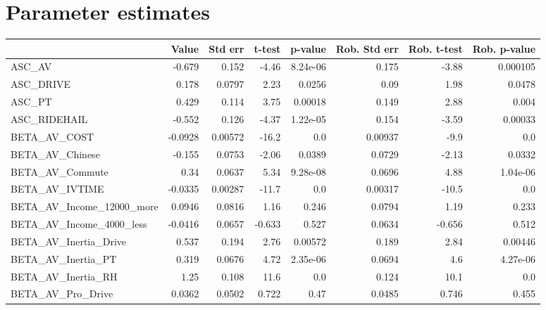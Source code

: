 \section{Parameter estimates}
\begin{tabular}{lrrrrrrr}
\toprule
{} &    Value &  Std err &   t-test &  p-value &  Rob. Std err &  Rob. t-test &  Rob. p-value \\
\midrule
ASC\_AV                       &   -0.679 &    0.152 &    -4.46 & 8.24e-06 &         0.175 &        -3.88 &      0.000105 \\
ASC\_DRIVE                    &    0.178 &   0.0797 &     2.23 &   0.0256 &          0.09 &         1.98 &        0.0478 \\
ASC\_PT                       &    0.429 &    0.114 &     3.75 &  0.00018 &         0.149 &         2.88 &         0.004 \\
ASC\_RIDEHAIL                 &   -0.552 &    0.126 &    -4.37 & 1.22e-05 &         0.154 &        -3.59 &       0.00033 \\
BETA\_AV\_COST                 &  -0.0928 &  0.00572 &    -16.2 &      0.0 &       0.00937 &         -9.9 &           0.0 \\
BETA\_AV\_Chinese              &   -0.155 &   0.0753 &    -2.06 &   0.0389 &        0.0729 &        -2.13 &        0.0332 \\
BETA\_AV\_Commute              &     0.34 &   0.0637 &     5.34 & 9.28e-08 &        0.0696 &         4.88 &      1.04e-06 \\
BETA\_AV\_IVTIME               &  -0.0335 &  0.00287 &    -11.7 &      0.0 &       0.00317 &        -10.5 &           0.0 \\
BETA\_AV\_Income\_12000\_more    &   0.0946 &   0.0816 &     1.16 &    0.246 &        0.0794 &         1.19 &         0.233 \\
BETA\_AV\_Income\_4000\_less     &  -0.0416 &   0.0657 &   -0.633 &    0.527 &        0.0634 &       -0.656 &         0.512 \\
BETA\_AV\_Inertia\_Drive        &    0.537 &    0.194 &     2.76 &  0.00572 &         0.189 &         2.84 &       0.00446 \\
BETA\_AV\_Inertia\_PT           &    0.319 &   0.0676 &     4.72 & 2.35e-06 &        0.0694 &          4.6 &      4.27e-06 \\
BETA\_AV\_Inertia\_RH           &     1.25 &    0.108 &     11.6 &      0.0 &         0.124 &         10.1 &           0.0 \\
BETA\_AV\_Pro\_Drive            &   0.0362 &   0.0502 &    0.722 &     0.47 &        0.0485 &        0.746 &         0.455 \\

\end{tabular}
